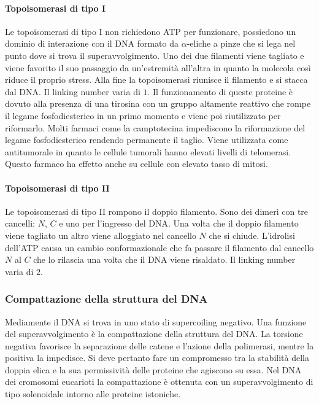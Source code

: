 			\paragraph{Topoisomerasi di tipo I} 
			Le topoisomerasi di tipo I non richiedono ATP per funzionare, possiedono un dominio di interazione con il DNA formato da $\alpha$-eliche a pinze che si lega nel punto dove si trova il superavvolgimento. 
			Uno dei due filamenti viene tagliato e viene favorito il suo passaggio da un'estremit\`a all'altra in quanto la molecola cos\`i riduce il proprio stress. 
			Alla fine  la topoisomerasi riunisce il filamento e si stacca dal DNA. 
			Il linking number varia di $1$. 
			Il funzionamento di queste proteine \`e dovuto alla presenza di una tirosina con un gruppo  altamente reattivo che rompe il legame fosfodiesterico in un primo momento e viene poi riutilizzato per riformarlo. 
			Molti farmaci come la camptotecina impediscono la riformazione del legame fosfodiesterico rendendo permanente il taglio. 
			Viene utilizzata come antitumorale in quanto le cellule tumorali hanno elevati livelli di telomerasi. 
			Questo farmaco ha effetto anche su cellule con elevato tasso di mitosi.

			\paragraph{Topoisomerasi di tipo II}
			Le topoisomerasi di tipo II rompono il doppio filamento. 
			Sono dei dimeri con tre cancelli: $N$, $C$ e uno per l'ingresso del DNA. 
			Una volta che il doppio filamento viene tagliato un altro viene alloggiato nel cancello $N$ che si chiude. 
			L'idrolisi dell'ATP causa un cambio conformazionale che fa passare il filamento dal cancello $N$ al $C$ che lo rilascia una volta che il DNA viene risaldato. 
			Il linking number varia di $2$. 

		\subsubsection{Compattazione della struttura del DNA}
		Mediamente il DNA si trova in uno stato di supercoiling negativo.
		Una funzione del superavvolgimento \`e la compattazione della struttura del DNA.
		La torsione negativa favorisce la separazione delle catene e l'azione della polimerasi, mentre la positiva la impedisce.
		Si deve pertanto fare un compromesso tra la stabilit\`a della doppia elica e la sua permissivit\`a delle proteine che agiscono su essa.
		Nel DNA dei cromosomi eucarioti la compattazione \`e ottenuta con un superavvolgimento di tipo solenoidale intorno alle proteine istoniche.

